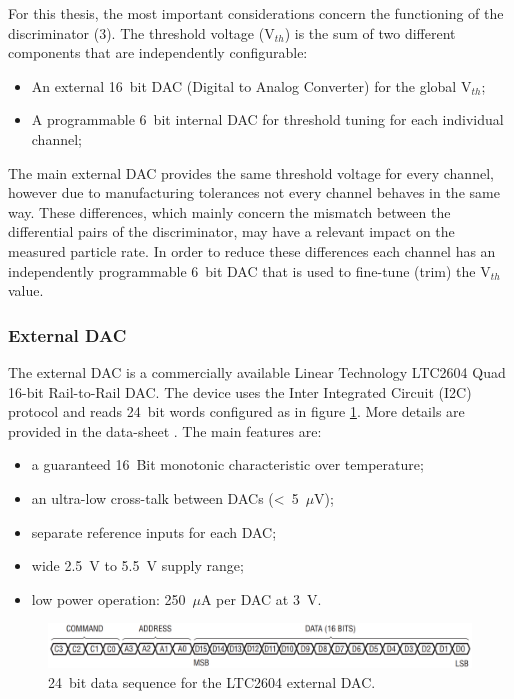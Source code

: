 \noindent For this thesis, the most important considerations concern the functioning of the discriminator (3).
The threshold voltage (V$_{th}$) is the sum of two different components that are independently configurable:
\begin{itemize}
	\item An external 16~bit DAC (Digital to Analog Converter) for the global V$_{th}$;
	\item A programmable 6~bit internal DAC for threshold tuning for each individual channel;
\end{itemize}
\noindent The main external DAC provides the same threshold voltage for every channel, however due to manufacturing tolerances not every channel behaves in the same way.
These differences, which mainly concern the mismatch between the differential pairs of the discriminator, may have a relevant impact on the measured particle rate.
In order to reduce these differences each channel has an independently programmable 6~bit DAC that is used to fine-tune (trim) the V$_{th}$ value.    
\subsubsection{External DAC}
The external DAC is a commercially available Linear Technology LTC2604 Quad 16-bit Rail-to-Rail DAC.
The device uses the Inter Integrated Circuit (I2C) protocol and reads 24~bit words configured as in figure \ref{fig:extdactiming2}.
More details are provided in the data-sheet \cite{LTC2604}.
The main features are:
\begin{itemize}
	\item a guaranteed 16~Bit monotonic characteristic over temperature;
	\item an ultra-low cross-talk between DACs (<~5~$\mu$V);
	\item separate reference inputs for each DAC;
	\item wide 2.5~V to 5.5~V supply range;
	\item low power operation: 250~$\mu$A per DAC at 3~V.
\end{itemize} 
\begin{figure}[H]
	\centering
	\includegraphics[width=0.99\linewidth]{IMG/ch2/EXTDACTIMING2}
	\caption{24~bit data sequence for the LTC2604 external DAC.}
	\label{fig:extdactiming2}
\end{figure}
